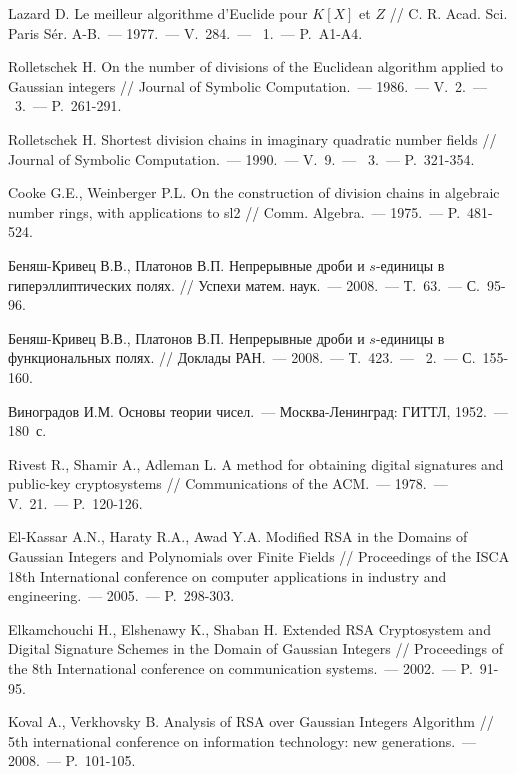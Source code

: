 \documentclass[_00_dissertation.tex]{subfiles}
\begin{document}
\begin{thebibliography}{99}
    Lazard D. Le meilleur algorithme d'{E}uclide pour {$K[X]$} et {$Z$} // C. R. Acad. Sci. Paris S\'er. A-B.~--- 1977.~--- V.~284.~--- \textnumero~1.~--- P.~A1-A4.

    Rolletschek H. On the number of divisions of the Euclidean algorithm applied to Gaussian integers // Journal of Symbolic Computation.~--- 1986.~--- V.~2.~--- \textnumero~3.~--- P.~261-291.
    
    Rolletschek H. Shortest division chains in imaginary quadratic number fields // Journal of Symbolic Computation.~--- 1990.~--- V.~9.~--- \textnumero~3.~--- P.~321-354.

    Cooke G.E., Weinberger P.L. On the construction of division chains in algebraic number rings, with applications to sl2 // Comm. Algebra.~--- 1975.~--- P.~481-524.

    Беняш-Кривец В.В., Платонов В.П. Непрерывные дроби и $s$-единицы в гиперэллиптических полях. // Успехи матем. наук.~--- 2008.~--- Т.~63.~--- С.~95-96.
    
    Беняш-Кривец В.В., Платонов В.П. Непрерывные дроби и $s$-единицы в функциональных полях. // Доклады РАН.~--- 2008.~--- Т.~423.~--- \textnumero~2.~--- С.~155-160.

    Виноградов И.М. Основы теории чисел.~--- Москва-Ленинград: ГИТТЛ, 1952.~--- 180~с.

    Rivest R., Shamir A., Adleman L. A method for obtaining digital signatures and public-key cryptosystems // Communications of the ACM.~--- 1978.~--- V.~21.~--- P.~120-126.

    El-Kassar A.N., Haraty R.A., Awad Y.A. Modified RSA in the Domains of Gaussian Integers and Polynomials over Finite Fields // Proceedings of the ISCA 18th International conference on computer applications in industry and engineering.~--- 2005.~--- P.~298-303.

    Elkamchouchi H., Elshenawy K., Shaban H. Extended RSA Cryptosystem and Digital Signature Schemes in the Domain of Gaussian Integers // Proceedings of the 8th International conference on communication systems.~--- 2002.~--- P.~91-95.

    Koval A., Verkhovsky B. Analysis of RSA over Gaussian Integers Algorithm // 5th international conference on information technology: new generations.~--- 2008.~--- P.~101-105.


\end{thebibliography}
\end{document}
